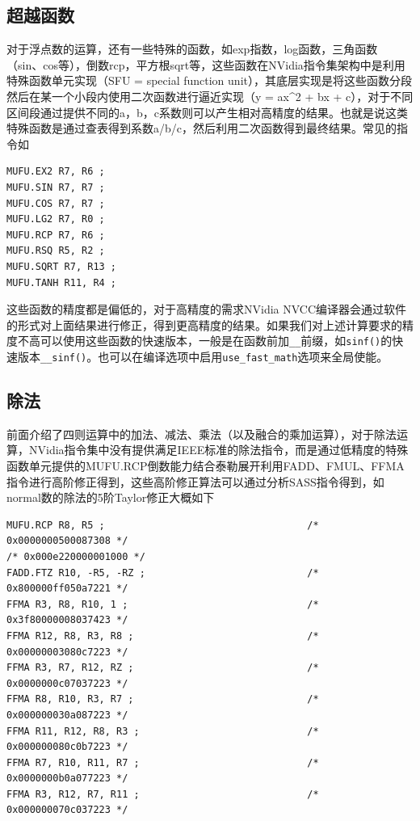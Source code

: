 \subsection{超越函数}

对于浮点数的运算，还有一些特殊的函数，如exp指数，log函数，三角函数（sin、cos等），倒数rcp，平方根sqrt等，这些函数在NVidia指令集架构中是利用特殊函数单元实现（SFU = special function unit），其底层实现是将这些函数分段然后在某一个小段内使用二次函数进行逼近实现（y = ax\textasciicircum{}2 + bx + c），对于不同区间段通过提供不同的a，b，c系数则可以产生相对高精度的结果。也就是说这类特殊函数是通过查表得到系数a/b/c，然后利用二次函数得到最终结果。常见的指令如

\begin{lstlisting}
MUFU.EX2 R7, R6 ;
MUFU.SIN R7, R7 ;
MUFU.COS R7, R7 ;
MUFU.LG2 R7, R0 ;
MUFU.RCP R7, R6 ;
MUFU.RSQ R5, R2 ;
MUFU.SQRT R7, R13 ;
MUFU.TANH R11, R4 ;
\end{lstlisting}

这些函数的精度都是偏低的，对于高精度的需求NVidia NVCC编译器会通过软件的形式对上面结果进行修正，得到更高精度的结果。如果我们对上述计算要求的精度不高可以使用这些函数的快速版本，一般是在函数前加\lstinline|__|前缀，如\lstinline|sinf()|的快速版本\lstinline|__sinf()|。也可以在编译选项中启用\lstinline|use_fast_math|选项来全局使能。

\subsection{除法}

前面介绍了四则运算中的加法、减法、乘法（以及融合的乘加运算），对于除法运算，NVidia指令集中没有提供满足IEEE标准的除法指令，而是通过低精度的特殊函数单元提供的MUFU.RCP倒数能力结合泰勒展开利用FADD、FMUL、FFMA指令进行高阶修正得到，这些高阶修正算法可以通过分析SASS指令得到，如normal数的除法的5阶Taylor修正大概如下

\begin{lstlisting}
MUFU.RCP R8, R5 ;                                   /* 0x0000000500087308 */                                                                                      /* 0x000e220000001000 */
FADD.FTZ R10, -R5, -RZ ;                            /* 0x800000ff050a7221 */
FFMA R3, R8, R10, 1 ;                               /* 0x3f80000008037423 */
FFMA R12, R8, R3, R8 ;                              /* 0x00000003080c7223 */
FFMA R3, R7, R12, RZ ;                              /* 0x0000000c07037223 */
FFMA R8, R10, R3, R7 ;                              /* 0x000000030a087223 */
FFMA R11, R12, R8, R3 ;                             /* 0x000000080c0b7223 */
FFMA R7, R10, R11, R7 ;                             /* 0x0000000b0a077223 */
FFMA R3, R12, R7, R11 ;                             /* 0x000000070c037223 */
\end{lstlisting}

